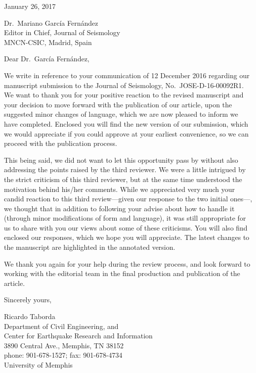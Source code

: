 \documentclass{article}
\begin{document}
\setlength{\parindent}{0ex}

January 26, 2017
\vspace{12ex}

Dr.~Mariano Garc\'{i}a Fern\'{a}ndez\\
Editor in Chief, Journal of Seismology\\
MNCN-CSIC, Madrid, Spain
\vspace{8ex}

\setlength{\parskip}{2ex}

Dear Dr.~Garc\'{i}a Fern\'{a}ndez,

We write in reference to your communication of 12 December 2016 regarding our manuscript submission to the Journal of Seismology, No.~JOSE-D-16-00092R1. We want to thank you for your positive reaction to the revised manuscript and your decision to move forward with the publication of our article, upon the suggested minor changes of language, which we are now pleased to inform we have completed. Enclosed you will find the new version of our submission, which we would appreciate if you could approve at your earliest convenience, so we can proceed with the publication process.

This being said, we did not want to let this opportunity pass by without also addressing the points raised by the third reviewer. We were a little intrigued by the strict criticism of this third reviewer, but at the same time understood the motivation behind his/her comments. While we appreciated very much your candid reaction to this third review---given our response to the two initial ones---, we thought that in addition to following your advise about how to handle it (through minor modifications of form and language), it was still appropriate for us to share with you our views about some of these criticisms. You will also find enclosed our responses, which we hope you will appreciate. The latest changes to the manuscript are highlighted in the annotated version.

We thank you again for your help during the review process, and look forward to working with the editorial team in the final production and publication of the article.

\vspace{5ex}
Sincerely yours,
\vspace{10ex}

Ricardo Taborda\\
Department of Civil Engineering, and\\
Center for Earthquake Research and Information\\
3890 Central Ave., Memphis, TN 38152\\
phone: 901-678-1527; fax: 901-678-4734\\
University of Memphis
\end{document}
